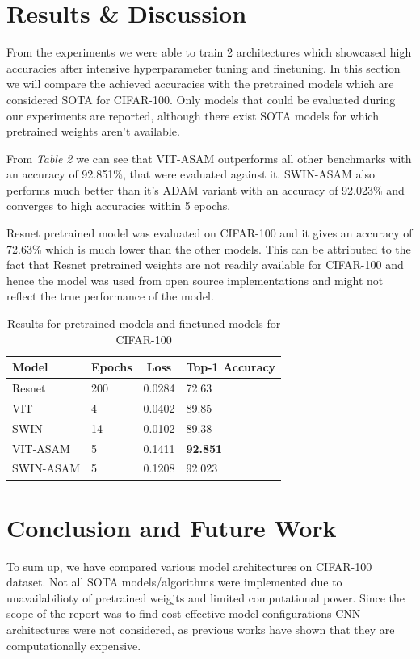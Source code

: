 \documentclass{article}
\begin{document}
\section{Results \& Discussion}
From the experiments we were able to train 2 architectures which showcased high accuracies after intensive hyperparameter tuning and finetuning.
In this section we will compare the achieved accuracies with the pretrained models which are considered SOTA for CIFAR-100.
Only models that could be evaluated during our experiments are reported, although there exist SOTA models for which pretrained weights aren't available.

From \textit{Table 2} we can see that VIT-ASAM outperforms all other benchmarks with an accuracy of 92.851\%, that were evaluated against it.
SWIN-ASAM also performs much better than it's ADAM variant with an accuracy of 92.023\% and converges to high accuracies within 5 epochs.

Resnet pretrained model was evaluated on CIFAR-100 and it gives an accuracy of 72.63\% which is much lower than the other models.
This can be attributed to the fact that Resnet pretrained weights are not readily available for CIFAR-100 and hence the model was used from open source implementations and might not reflect the true performance of the model.

\begin{table}[ht]
    \begin{tabular}{|l|l|c|l|}
        \hline
        \textbf{Model} & \textbf{Epochs} & \textbf{Loss} & \textbf{Top-1 Accuracy} \\ \hline
        Resnet         & 200             & 0.0284        & 72.63                   \\ \hline
        VIT            & 4               & 0.0402        & 89.85                   \\ \hline
        SWIN           & 14              & 0.0102        & 89.38                   \\ \hline
        VIT-ASAM       & 5               & 0.1411        & \textbf{92.851}         \\ \hline
        SWIN-ASAM      & 5               & 0.1208        & 92.023                  \\ \hline
    \end{tabular}
    \caption{Results for pretrained models and finetuned models for CIFAR-100}
\end{table}


\section{Conclusion and Future Work}
To sum up, we have compared various model architectures on CIFAR-100 dataset.
Not all SOTA models/algorithms were implemented due to unavailabilioty of pretrained weigjts and limited computational power.
Since the scope of the report was to find cost-effective model configurations CNN architectures were not considered, as previous works have shown that they are computationally expensive.
\end{document}
